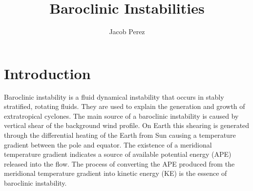 \documentclass{article}
\title{Baroclinic Instabilities}
\author{Jacob Perez}
\begin{document}
 
\maketitle
\tableofcontents 
\section{Introduction} 
Baroclinic instability is a fluid dynamical instability that occurs in stably stratified, rotating fluids. They are used to explain the generation and growth of extratropical cyclones. The main source of a baroclinic instability is caused by vertical shear of the background wind profile. On Earth this shearing is generated through the differential heating of the Earth from Sun causing a temperature gradient between the pole and equator. The existence of a meridional temperature gradient indicates a source of available potential energy (APE) released into the flow. The process of converting the APE produced from the meridional temperature gradient into kinetic energy (KE) is the essence of baroclinic instability.  
\end{document}

